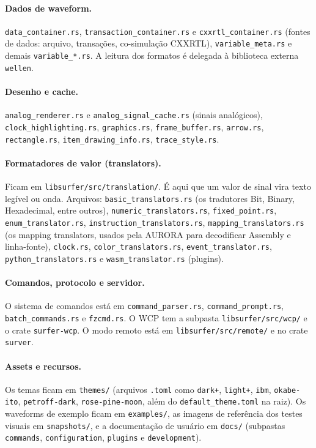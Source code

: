 \documentclass[11pt,a4paper]{article}
\begin{document}
\paragraph{Dados de waveform.}
\texttt{data\_container.rs}, \texttt{transaction\_container.rs} e
\texttt{cxxrtl\_container.rs} (fontes de dados: arquivo, transações, co-simulação
CXXRTL), \texttt{variable\_meta.rs} e demais \texttt{variable\_*.rs}. A leitura
dos formatos é delegada à biblioteca externa \texttt{wellen}.

\paragraph{Desenho e cache.}
\texttt{analog\_renderer.rs} e \texttt{analog\_signal\_cache.rs} (sinais
analógicos), \texttt{clock\_highlighting.rs}, \texttt{graphics.rs},
\texttt{frame\_buffer.rs}, \texttt{arrow.rs}, \texttt{rectangle.rs},
\texttt{item\_drawing\_info.rs}, \texttt{trace\_style.rs}.

\paragraph{Formatadores de valor (translators).}
Ficam em \texttt{libsurfer/src/translation/}. É aqui que um valor de sinal vira
texto legível ou onda. Arquivos: \texttt{basic\_translators.rs} (os tradutores
Bit, Binary, Hexadecimal, entre outros), \texttt{numeric\_translators.rs},
\texttt{fixed\_point.rs}, \texttt{enum\_translator.rs},
\texttt{instruction\_translators.rs}, \texttt{mapping\_translators.rs} (os
mapping translators, usados pela AURORA para decodificar Assembly e linha-fonte),
\texttt{clock.rs}, \texttt{color\_translators.rs}, \texttt{event\_translator.rs},
\texttt{python\_translators.rs} e \texttt{wasm\_translator.rs} (plugins).

\paragraph{Comandos, protocolo e servidor.}
O sistema de comandos está em \texttt{command\_parser.rs},
\texttt{command\_prompt.rs}, \texttt{batch\_commands.rs} e \texttt{fzcmd.rs}. O
WCP tem a subpasta \texttt{libsurfer/src/wcp/} e o crate \texttt{surfer-wcp}. O
modo remoto está em \texttt{libsurfer/src/remote/} e no crate \texttt{surver}.

\paragraph{Assets e recursos.}
Os temas ficam em \texttt{themes/} (arquivos \texttt{.toml} como \texttt{dark+},
\texttt{light+}, \texttt{ibm}, \texttt{okabe-ito}, \texttt{petroff-dark},
\texttt{rose-pine-moon}, além do \texttt{default\_theme.toml} na raiz). Os
waveforms de exemplo ficam em \texttt{examples/}, as imagens de referência dos
testes visuais em \texttt{snapshots/}, e a documentação de usuário em
\texttt{docs/} (subpastas \texttt{commands}, \texttt{configuration},
\texttt{plugins} e \texttt{development}).
\end{document}

